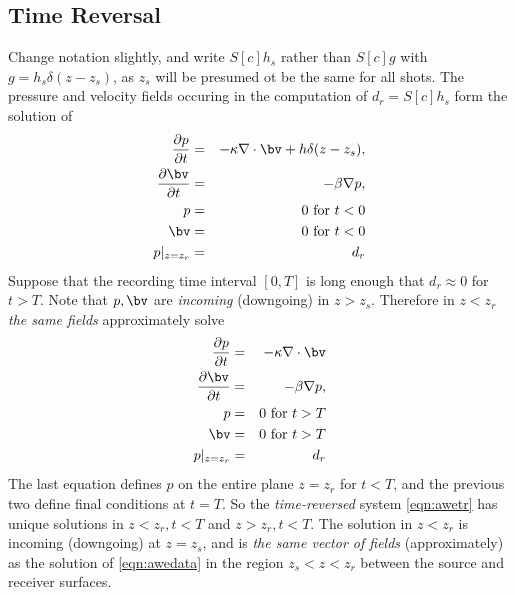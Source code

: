 

\subsection{Time Reversal}


Change notation slightly, and write $S[c]h_s$ rather than $S[c]g$ with $g = h_s \delta(z-z_s)$, as $z_s$ will be presumed ot be the same for all shots. The pressure and velocity fields occuring in the computation of $d_r=S[c]h_s$ form the solution of
\begin{eqnarray}
\label{eqn:awedata}
\frac{\partial p}{\partial t} & = & - \kappa \nabla \cdot \bv +
h \delta(z-z_s), \nonumber \\
\frac{\partial \bv}{\partial t} & = & - \beta \nabla p,\nonumber \\
p & =& 0 \mbox{ for } t<0\nonumber\\ 
\bv & = & 0 \mbox{ for } t<0 \nonumber\\
 p|_{z=z_r}& = & d_r
\end{eqnarray}
Suppose that the recording time interval $[0,T]$ is long enough that $ d_r \approx 0$ for $t > T$. Note that $p,\bv$ are {\em incoming} (downgoing) in $z>z_s$. Therefore in $z<z_r$ {\em the same fields} approximately solve
\begin{eqnarray}
\label{eqn:awetr}
\frac{\partial p}{\partial t} & = & - \kappa \nabla \cdot \bv \nonumber \\
\frac{\partial \bv}{\partial t} & = & - \beta \nabla p,\nonumber \\
p & =& 0 \mbox{ for } t>T\nonumber\\ 
\bv & = & 0 \mbox{ for } t>T \nonumber\\
p|_{z=z_r} &=&  d_r
\end{eqnarray} 
The last equation defines $p$ on the entire plane $z=z_r$ for $t<T$, and the previous two define final conditions at $t=T$. So the {\em time-reversed} system \ref{eqn:awetr} has unique solutions in $z<z_r, t<T$ and $z>z_r,t<T$. The solution in $z<z_r$ is incoming (downgoing) at $z=z_s$, and is {\em the same vector of fields} (approximately) as the solution of \ref{eqn:awedata} in the region $z_s<z<z_r$ between the source and receiver surfaces. 

